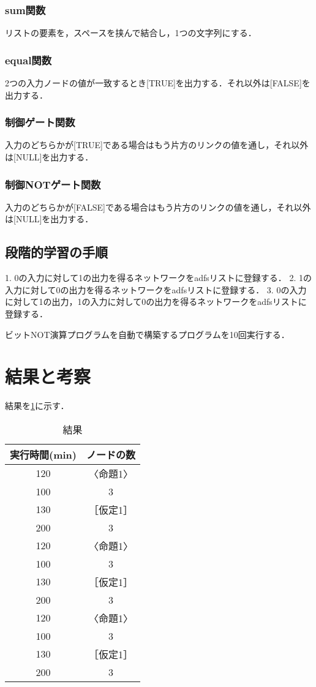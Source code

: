 \documentclass[exploratorypaper]{jsaiart} %
\begin{document}
\subsubsection{sum関数}
リストの要素を，スペースを挟んで結合し，1つの文字列にする．

\subsubsection{equal関数}
2つの入力ノードの値が一致するとき[TRUE]を出力する．それ以外は[FALSE]を出力する．
\subsubsection{制御ゲート関数}
入力のどちらかが[TRUE]である場合はもう片方のリンクの値を通し，それ以外は[NULL]を出力する．
\subsubsection{制御NOTゲート関数}
入力のどちらかが[FALSE]である場合はもう片方のリンクの値を通し，それ以外は[NULL]を出力する．

\subsection{段階的学習の手順}
1. 0の入力に対して1の出力を得るネットワークをadfsリストに登録する．
2. 1の入力に対して0の出力を得るネットワークをadfsリストに登録する．
3. 0の入力に対して1の出力，1の入力に対して0の出力を得るネットワークをadfsリストに登録する．

ビットNOT演算プログラムを自動で構築するプログラムを10回実行する．
\section{結果と考察}
結果を\ref{tbl:result}に示す．

\begin{table}[htbp]
\centering
\caption{結果}
\label{tbl:result}
\begin{tabular}{cc}
    \hline
     実行時間(min) & ノードの数\\
    \hline
    120 & 〈命題1〉 \\
    100 & 3 \\
    \hline
    130 & ［仮定1］ \\
    200 & 3 \\
    \hline
    120 & 〈命題1〉 \\
    100 & 3 \\
    \hline
    130 & ［仮定1］ \\
    200 & 3 \\
    \hline
    120 & 〈命題1〉 \\
    100 & 3 \\
    \hline
    130 & ［仮定1］ \\
    200 & 3 \\
    \hline
\end{tabular}
\end{table}
\end{document}
